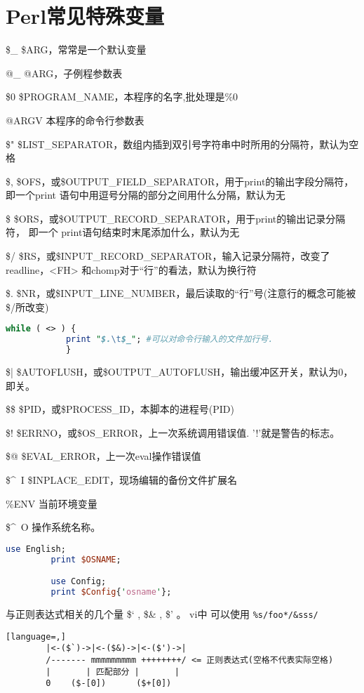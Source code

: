 \documentclass[a4paper,11pt]{book}
\begin{document}
\section{Perl常见特殊变量}
\begin{description*}
    \item [\$_]\$ARG，常常是一个默认变量 
    \item [@_]@ARG，子例程参数表 
    \item [\$0] \$PROGRAM_NAME，本程序的名字,批处理是\%0
    \item [@ARGV]本程序的命令行参数表 
    \item [\$"]\$LIST_SEPARATOR，数组内插到双引号字符串中时所用的分隔符，默认为空格 
    \item [\$,]\$OFS，或\$OUTPUT_FIELD_SEPARATOR，用于print的输出字段分隔符，即一个print
        语句中用逗号分隔的部分之间用什么分隔，默认为无 
    \item [\$ ]\$ORS，或\$OUTPUT_RECORD_SEPARATOR，用于print的输出记录分隔符， 即一个
        print语句结束时末尾添加什么，默认为无 
    \item [\$/] \$RS，或\$INPUT_RECORD_SEPARATOR，输入记录分隔符，改变了readline，<FH>
        和chomp对于“行”的看法，默认为换行符 
    \item [\$.] \$NR，或\$INPUT_LINE_NUMBER，最后读取的“行”号(注意行的概念可能被\$/所改变) 
        \begin{lstlisting}[language=perl]
            while ( <> ) {
            print "$.\t$_"; #可以对命令行输入的文件加行号.  
            }
        \end{lstlisting}
    \item [\$|] \$AUTOFLUSH，或\$OUTPUT_AUTOFLUSH，输出缓冲区开关，默认为0，即关。
    \item [\$\$]\$PID，或\$PROCESS_ID，本脚本的进程号(PID) 
    \item [\$!]\$ERRNO，或\$OS_ERROR，上一次系统调用错误值. '!'就是警告的标志。
    \item [\$@]\$EVAL_ERROR，上一次eval操作错误值 
    \item [\$\^~I]\$INPLACE_EDIT，现场编辑的备份文件扩展名 
    \item [\%ENV]当前环境变量 

    \item [\$\^~O] 操作系统名称。 
        \begin{lstlisting}[language=perl,multicols=2,xleftmargin=2pt]
         use English;
         print $OSNAME; 

         use Config; 
         print $Config{'osname'}; 
        \end{lstlisting}
    \item [与正则表达式相关的几个量] \$` , \$\& , \$'  。 vi中 可以使用
        \lstinline{%s/foo*/&sss/}
        \begin{lstlisting}[language=,]
        |<-($`)->|<-($&)->|<-($')->| 
        /------- mmmmmmmmm ++++++++/ <= 正则表达式(空格不代表实际空格) 
        |       | 匹配部分 |       |
        0    ($-[0])      ($+[0]) 
        \end{lstlisting}


\end{description*}
\end{document}
